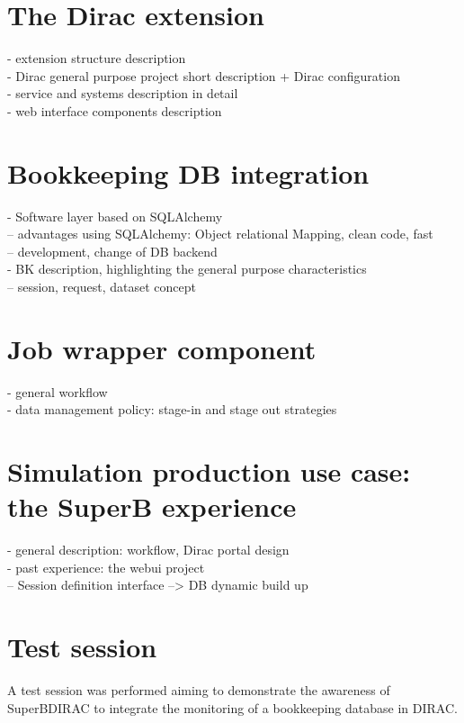 \documentclass[a4paper]{jpconf}
\begin{document}
\section{The Dirac extension} 
- extension structure description\\
- Dirac general purpose project short description + Dirac configuration\\
- service and systems description in detail\\
- web interface components description\\


\section{Bookkeeping DB integration}
- Software layer based on SQLAlchemy\\
-- advantages using SQLAlchemy: Object relational Mapping, clean code, fast\\
-- development, change of DB backend\\
- BK description, highlighting the general purpose characteristics\\
-- session, request, dataset concept\\

 
\section{Job wrapper component}
- general workflow\\
- data management policy: stage-in and stage out strategies\\
 
\section{Simulation production use case: the SuperB experience}
- general description: workflow, Dirac portal design\\
- past experience: the webui project\\
-- Session definition interface --> DB dynamic build up\\
 
\section{Test session}
A test session was performed aiming to demonstrate the awareness of SuperBDIRAC to integrate the monitoring of a bookkeeping database in DIRAC.
\end{document}
